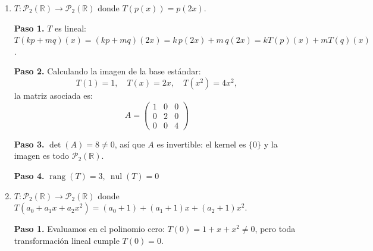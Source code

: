\begin{prob}
\begin{enumerate}[$a)$]
\begin{myproof}
\textbf{Paso 3.} Para el kernel resolvemos $A\vec{x} = 0$: la primera ecuación da $a = 0$; la tercera, $c = -a = 0$; la segunda, $b = d$; y la cuarta, $a + b - c - d = b - d = 0$, se cumple automáticamente. Con $d$ libre:
\[
\ker(T) = \text{span}\left\{ \begin{pmatrix} 0 & 1 \\ 0 & 1 \end{pmatrix} \right\}
\]
(en efecto, $T\begin{pmatrix} 0 & 1 \\ 0 & 1 \end{pmatrix} = 2\cdot 0 + (1-1)x - (0+0)x^2 + (0+1-0-1)x^3 = 0$).

\textbf{Paso 4.} La reducción por filas deja pivotes en las columnas $1$, $2$ y $3$, así que esas columnas de $A$ forman una base de la imagen:
\[
\operatorname{Im}(T) = \text{span}\left\{ 2 - x^2 + x^3,\ x + x^3,\ -x^2 - x^3 \right\}.
\]
$\boxed{\operatorname{rang}(T)=3,\ \operatorname{nul}(T)=1}$
\end{myproof}

\item $T:\mathcal{P}_{2}(\mathbb{R}) \rightarrow \mathcal{P}_{2}(\mathbb{R})$ donde $T(p(x))= p(2x).$
\begin{myproof}
\textbf{Paso 1.} $T$ es lineal: $T(kp + mq)(x) = (kp+mq)(2x) = k\,p(2x) + m\,q(2x) = kT(p)(x) + mT(q)(x)$.

\textbf{Paso 2.} Calculando la imagen de la base estándar:
\[
T(1) = 1, \quad T(x) = 2x, \quad T(x^2) = 4x^2,
\]
la matriz asociada es:
\[
A = \begin{pmatrix}
1 & 0 & 0 \\
0 & 2 & 0 \\
0 & 0 & 4
\end{pmatrix}
\]

\textbf{Paso 3.} $\det(A) = 8 \neq 0$, así que $A$ es invertible: el kernel es $\{0\}$ y la imagen es todo $\mathcal{P}_2(\mathbb{R})$.

\textbf{Paso 4.} $\boxed{\operatorname{rang}(T)=3,\ \operatorname{nul}(T)=0}$
\end{myproof}

\item $T:\mathcal{P}_{2}(\mathbb{R}) \rightarrow \mathcal{P}_{2}(\mathbb{R})$ donde $T(a_0+a_1x+a_2x^2)=(a_0+1)+(a_1+1)x+(a_2+1)x^2.$
\begin{myproof}
\textbf{Paso 1.} Evaluamos en el polinomio cero: $T(0) = 1 + x + x^2 \neq 0$, pero toda transformación lineal cumple $T(0) = 0$.


\end{myproof}
\end{enumerate}
\end{prob}
